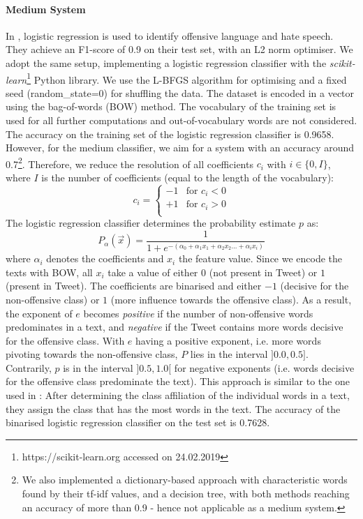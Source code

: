 \paragraph{Medium System}
In \cite{davidson2017automated}, logistic regression is used to identify offensive language and hate speech. They achieve an F1-score of 0.9 on their test set, with an L2 norm optimiser. We adopt the same setup, implementing a logistic regression classifier with the \textit{scikit-learn}\footnote{https://scikit-learn.org accessed on 24.02.2019} Python library. We use the L-BFGS algorithm for optimising and a fixed seed (random\_state=0) for shuffling the data. The dataset is encoded in a vector using the bag-of-words (BOW) method. The vocabulary of the training set is used for all further computations and out-of-vocabulary words are not considered. The accuracy on the training set of the logistic regression classifier is 0.9658. However, for the medium classifier, we aim for a system with an accuracy around 0.7\setcounter{footnote}{0}\renewcommand*{\thefootnote}{\fnsymbol{footnote}}\footnote{We also implemented a dictionary-based approach with characteristic words found by their tf-idf values, and a decision tree, with both methods reaching an accuracy of more than 0.9 - hence not applicable as a medium system.}\renewcommand*{\thefootnote}{\arabic{footnote}}\setcounter{footnote}{18}. Therefore, we reduce the resolution of all coefficients $c_i$ with $i \in \{0,I\}$, where $I$ is the number of coefficients (equal to the length of the vocabulary): 
\[c_i =
\begin{cases}
	-1 & \text{for   } c_i<0 \\
	+1 & \text{for   } c_i>0 \\
\end{cases}\]
The logistic regression classifier determines the probability estimate $p$ as:
\[
P_\alpha(\vec{x})=\frac{1}{1+e^{-(\alpha_0+\alpha_1x_1+\alpha_2x_2...+\alpha_ix_i)}}
\]
where $\alpha_i$ denotes the coefficients and $x_i$ the feature value. Since we encode the texts with BOW, all $x_i$ take a value of either $0$ (not present in Tweet) or $1$ (present in Tweet). The coefficients are binarised and either $-1$ (decisive for the non-offensive class) or $1$ (more influence towards the offensive class). As a result, the exponent of $e$ becomes \textit{positive} if the number of non-offensive words predominates in a text, and \textit{negative} if the Tweet contains more words decisive for the offensive class. With $e$ having a positive exponent, i.e. more words pivoting towards the non-offensive class, $P$ lies in the interval $]0.0,0.5]$. Contrarily, $p$ is in the interval $]0.5,1.0[$ for negative exponents (i.e. words decisive for the offensive class predominate the text). This approach is similar to the one used in \cite{klenner2018offensive}: After determining the class affiliation of the individual words in a text, they assign the class that has the most words in the text. The accuracy of the binarised logistic regression classifier on the test set is 0.7628.

